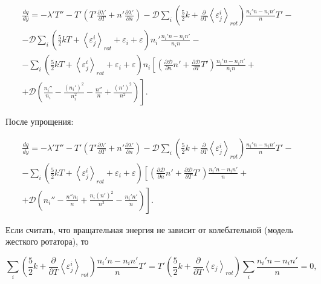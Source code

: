 \documentclass[12pt]{article}
\begin{document}
\begin{multline}
  \frac{d q}{d y} = -\lambda' T'' - T' \left(T' \frac{\partial \lambda'}{\partial T} + n' \frac{\partial \lambda'}{\partial n} \right) - \mathcal{D} \sum_{i}\left(\frac{5}{2}k + \frac{\partial}{\partial T}\left<\varepsilon^{i}_{j}\right>_{rot} \right)\frac{n_{i}'n - n_{i}n'}{n}T' - \\
  - \mathcal{D} \sum_{i}\left(\frac{5}{2}kT + \left<\varepsilon^{i}_{j} \right>_{rot} + \varepsilon_{i} + \varepsilon \right) n_{i}'\frac{n_{i}'n - n_{i}n'}{n_{i}n}
  - \\
  - \sum_{i}\left(\frac{5}{2}kT + \left<\varepsilon^{i}_{j} \right>_{rot} + \varepsilon_{i} + \varepsilon \right) n_{i}\left[\left(\frac{\partial \mathcal{D}}{\partial n}n' + \frac{\partial \mathcal{D}}{\partial T}T' \right) \frac{n_{i}'n - n_{i}n'}{n_{i}n} + \right. \\ + \left. \mathcal{D}\left(\frac{n_{i}''}{n_{i}} - \frac{\left(n_{i}'\right)^2}{n_{i}^2} - \frac{n''}{n} + \frac{\left(n'\right)^2}{n^2} \right) \right].
\end{multline}

После упрощения:

\begin{multline}
  \frac{d q}{d y} = -\lambda' T'' - T' \left(T' \frac{\partial \lambda'}{\partial T} + n' \frac{\partial \lambda'}{\partial n} \right) - \mathcal{D} \sum_{i}\left(\frac{5}{2}k + \frac{\partial}{\partial T}\left<\varepsilon^{i}_{j}\right>_{rot} \right)\frac{n_{i}'n - n_{i}n'}{n}T' - \\
  - \sum_{i} \left(\frac{5}{2}kT + \left<\varepsilon^{i}_{j} \right>_{rot} + \varepsilon_{i} + \varepsilon \right) \left[\left(\frac{\partial \mathcal{D}}{\partial n}n' + \frac{\partial \mathcal{D}}{\partial T}T' \right) \frac{n_{i}'n - n_{i}n'}{n} \right. + \\
  + \left. \mathcal{D}\left(n_{i}'' - \frac{n''n_{i}}{n} + \frac{n_{i}\left(n'\right)^2}{n^2} - \frac{n_{i}'n'}{n} \right)  \right].
\end{multline}

Если считать, что вращательная энергия не зависит от колебательной (модель жесткого ротатора), то

\begin{equation}
  \sum_{i}\left(\frac{5}{2}k + \frac{\partial}{\partial T}\left<\varepsilon^{i}_{j}\right>_{rot} \right)\frac{n_{i}'n - n_{i}n'}{n}T' = T'\left(\frac{5}{2}k + \frac{\partial}{\partial T}\left<\varepsilon_{j}\right>_{rot} \right) \sum_{i}\frac{n_{i}'n - n_{i}n'}{n} = 0,
\end{equation}
\end{document}
